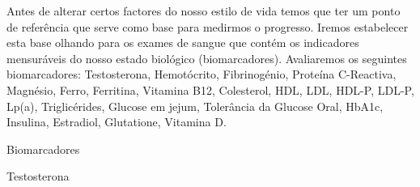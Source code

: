 \documentclass[12pt]{apa6}
\begin{document}
\justifying
Antes de alterar certos factores do nosso estilo de vida temos que ter um ponto
de refer\^encia que serve como base para medirmos o progresso. Iremos
estabelecer esta base olhando para os exames de sangue que cont\'em os
indicadores mensur\'aveis do nosso estado biol\'ogico (biomarcadores).
Avaliaremos os seguintes biomarcadores: Testosterona, Hemot\'ocrito,
Fibrinog\'enio, Prote\'ina C-Reactiva, Magn\'esio, Ferro, Ferritina, Vitamina
B12, Colesterol, HDL, LDL, HDL-P, LDL-P, Lp(a), Triglic\'erides, Glucose em
jejum, Toler\^ancia da Glucose Oral, HbA1c, Insulina, Estradiol, Glutatione,
Vitamina D. 


\begin{center}
    \Huge{Biomarcadores}
\end{center}

\Large{Testosterona}









\printbibliography
\end{document}

